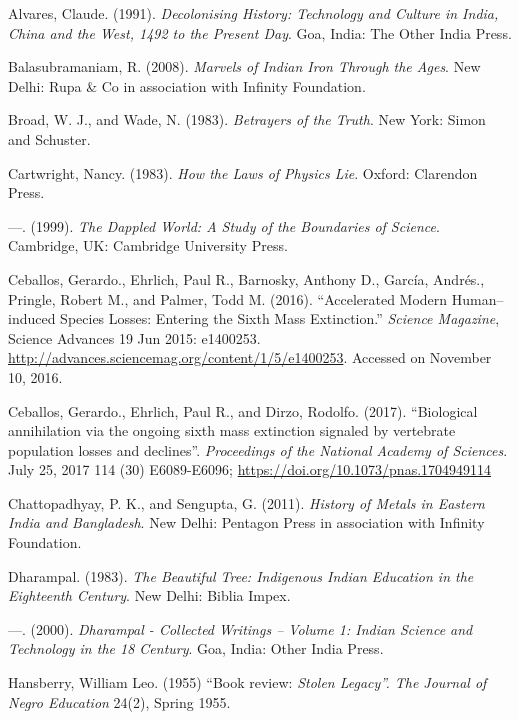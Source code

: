 \begin{thebibliography}{99}
 Alvares, Claude. (1991). \textit{Decolonising History: Technology and Culture in India, China and the West, 1492 to the Present Day}. Goa, India: The Other India Press.

  Balasubramaniam, R. (2008). \textit{Marvels of Indian Iron Through the Ages}. New Delhi: Rupa \& Co in association with Infinity Foundation.

  Broad, W. J., and Wade, N. (1983). \textit{Betrayers of the Truth}. New York: Simon and Schuster.

  Cartwright, Nancy. (1983). \textit{How the Laws of Physics Lie}. Oxford: Clarendon Press.

  ---. (1999). \textit{The Dappled World: A Study of the Boundaries of Science}. Cambridge, UK: Cambridge University Press.

  Ceballos, Gerardo., Ehrlich, Paul R., Barnosky, Anthony D., García, Andrés., Pringle, Robert M., and Palmer, Todd M. (2016). “Accelerated Modern Human–induced Species Losses: Entering the Sixth Mass Extinction.” \textit{Science Magazine}, Science Advances 19 Jun 2015: e1400253. \url{http://advances.sciencemag.org/content/1/5/e1400253}. Accessed on November 10, 2016.

  Ceballos, Gerardo., Ehrlich, Paul R., and Dirzo, Rodolfo. (2017). “Biological annihilation via the ongoing sixth mass extinction signaled by vertebrate population losses and declines”. \textit{Proceedings of the National Academy of Sciences}. July 25, 2017 114 (30) E6089-E6096; \url{https://doi.org/10.1073/pnas.1704949114}

  Chattopadhyay, P. K., and Sengupta, G. (2011). \textit{History of Metals in Eastern India and Bangladesh}. New Delhi: Pentagon Press in association with Infinity Foundation.

  Dharampal. (1983). \textit{The Beautiful Tree: Indigenous Indian Education in the Eighteenth Century}. New Delhi: Biblia Impex.

  ---. (2000). \textit{Dharampal - Collected Writings – Volume 1: Indian Science and Technology in the 18 Century}. Goa, India: Other India Press.

  Hansberry, William Leo. (1955) “Book review: \textit{Stolen Legacy”. The Journal of Negro Education} 24(2), Spring 1955.


\end{thebibliography}

